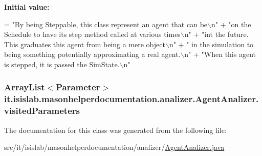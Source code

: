 {\bfseries Initial value\-:}
\begin{DoxyCode}
= \textcolor{stringliteral}{"By being Steppable, this class represent an agent that can be\(\backslash\)n"}
            + \textcolor{stringliteral}{"on the Schedule to have its step method called at various times\(\backslash\)n"}
            + \textcolor{stringliteral}{"int the future. This graduates this agent from being a mere object\(\backslash\)n"}
            + \textcolor{stringliteral}{" in the simulation to being something potentially approximating a real agent.\(\backslash\)n"}
            + \textcolor{stringliteral}{"When this agent is stepped, it is passed the SimState.\(\backslash\)n"}
\end{DoxyCode}
\hypertarget{classit_1_1isislab_1_1masonhelperdocumentation_1_1analizer_1_1_agent_analizer_a631132645fb74a4498f033579556efa9}{
\subsubsection[{visited\-Parameters}]{\setlength{\rightskip}{0pt plus 5cm}Array\-List$<${\bf Parameter}$>$ it.\-isislab.\-masonhelperdocumentation.\-analizer.\-Agent\-Analizer.\-visited\-Parameters\hspace{0.3cm}{\ttfamily [private]}}}\label{classit_1_1isislab_1_1masonhelperdocumentation_1_1analizer_1_1_agent_analizer_a631132645fb74a4498f033579556efa9}


The documentation for this class was generated from the following file\-:\begin{DoxyCompactItemize}
\item 
src/it/isislab/masonhelperdocumentation/analizer/\hyperlink{_agent_analizer_8java}{Agent\-Analizer.\-java}\end{DoxyCompactItemize}
